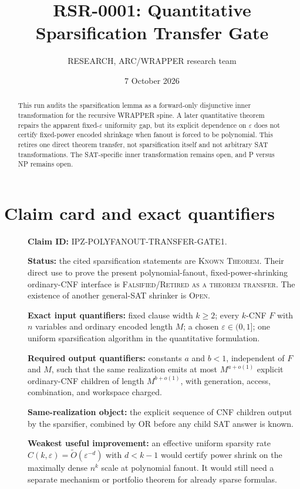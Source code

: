 \documentclass[11pt]{article}
\title{RSR-0001: Quantitative Sparsification Transfer Gate}
\author{RESEARCH, ARC/WRAPPER research team}
\date{7 October 2026}
\begin{document}
\maketitle

\begin{abstract}
This run audits the sparsification lemma as a forward-only disjunctive inner
transformation for the recursive WRAPPER spine.  A later quantitative theorem
repairs the apparent fixed-$\varepsilon$ uniformity gap, but its explicit
dependence on $\varepsilon$ does not certify fixed-power encoded shrinkage when
fanout is forced to be polynomial.  This retires one direct theorem transfer,
not sparsification itself and not arbitrary SAT transformations.  The
SAT-specific inner transformation remains open, and P versus NP remains open.
\end{abstract}

\section{Claim card and exact quantifiers}
\begin{description}
\item[] \textbf{Claim ID:} IPZ-POLYFANOUT-TRANSFER-GATE1.
\item[] \textbf{Status:} the cited sparsification statements are
\textsc{Known Theorem}.  Their direct use to prove the present
polynomial-fanout, fixed-power-shrinking ordinary-CNF interface is
\textsc{Falsified/Retired as a theorem transfer}.  The existence of another
general-SAT shrinker is \textsc{Open}.
\item[] \textbf{Exact input quantifiers:} fixed clause width $k\ge2$; every
$k$-CNF $F$ with $n$ variables and ordinary encoded length $M$; a chosen
$\varepsilon\in(0,1]$; one uniform sparsification algorithm in the quantitative
formulation.
\item[] \textbf{Required output quantifiers:} constants $a$ and $b<1$,
independent of $F$ and $M$, such that the same realization emits at most
$M^{a+o(1)}$ explicit ordinary-CNF children of length $M^{b+o(1)}$, with
generation, access, combination, and workspace charged.
\item[] \textbf{Same-realization object:} the explicit sequence of CNF
children output by the sparsifier, combined by OR before any child SAT answer
is known.
\item[] \textbf{Weakest useful improvement:} an effective uniform sparsity
rate $C(k,\varepsilon)=\widetilde O(\varepsilon^{-d})$ with $d<k-1$ would
certify power shrink on the maximally dense $n^k$ scale at polynomial fanout.
It would still need a separate mechanism or portfolio theorem for already
sparse formulas.
\end{description}
\end{document}
